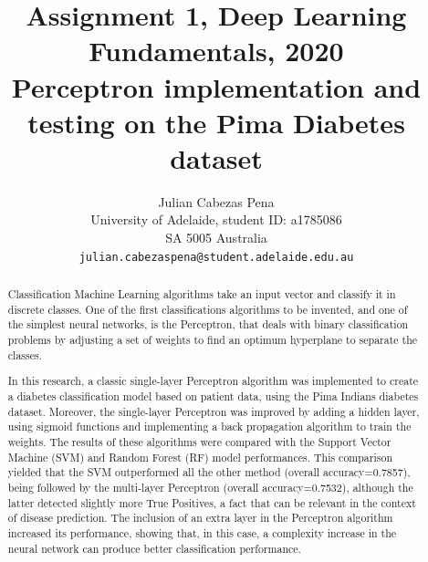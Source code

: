\documentclass[10pt,twocolumn,letterpaper]{article}
\begin{document}
\title{Assignment 1, Deep Learning Fundamentals, 2020 \\ Perceptron implementation and testing on the Pima Diabetes dataset}

\author{Julian Cabezas Pena\\
University of Adelaide, student ID: a1785086\\
SA 5005 Australia\\
{\tt\small julian.cabezaspena@student.adelaide.edu.au}
}

\maketitle

\begin{abstract}
Classification Machine Learning algorithms take an input vector and classify it in discrete classes. One of the first classifications algorithms to be invented, and one of the simplest neural networks, is the Perceptron, that deals with binary classification problems by adjusting a set of weights to find an optimum hyperplane to separate the classes. 

In this research, a classic single-layer Perceptron algorithm was implemented to create a diabetes classification model based on patient data, using the Pima Indians diabetes dataset. Moreover, the single-layer Perceptron was improved by adding a hidden layer, using sigmoid functions and implementing a back propagation algorithm to train the weights. The results of these algorithms were compared with the Support Vector Machine (SVM) and Random Forest (RF) model performances. This comparison yielded that the SVM outperformed all the other method (overall accuracy=0.7857), being followed by the multi-layer Perceptron (overall accuracy=0.7532), although the latter detected slightly more True Positives, a fact that can be relevant in the context of disease prediction. The inclusion of an extra layer in the Perceptron algorithm increased its performance, showing that, in this case, a complexity increase in the neural network can produce better classification performance.
\end{abstract}

\end{document}
